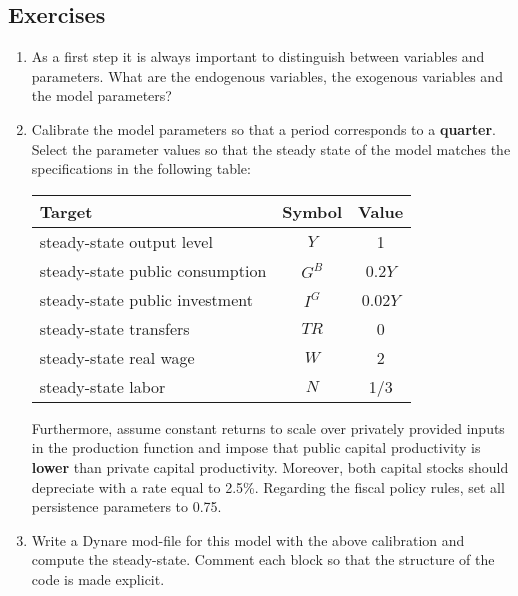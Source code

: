 \subsection*{Exercises}
\begin{enumerate}

\item As a first step it is always important to distinguish between variables and parameters.
What are the endogenous variables, the exogenous variables and the model parameters?  

\item Calibrate the model parameters so that a period corresponds to a \textbf{quarter}.
Select the parameter values so that the steady state of the model matches the specifications in the following table:
\begin{center}
\begin{tabular}{lcc}
Target & Symbol & Value \\\hline
steady-state output level          & $Y$ & 1 \\
steady-state public consumption    & $G^B$ & 0.2$Y$ \\
steady-state public investment     & $I^G$ & 0.02$Y$ \\
steady-state transfers             & $TR$ & 0 \\
steady-state real wage             & $W$ & 2\\
steady-state labor                 & $N$ & 1/3\\
\hline
\end{tabular}
\end{center}
Furthermore, assume constant returns to scale over privately provided inputs in the production function
  and impose that public capital productivity is \textbf{lower} than private capital productivity.
Moreover, both capital stocks should depreciate with a rate equal to 2.5\%.
Regarding the fiscal policy rules, set all persistence parameters to 0.75.

\item Write a Dynare mod-file for this model with the above calibration and compute the steady-state.
Comment each block so that the structure of the code is made explicit.

\newpage


\end{enumerate}
